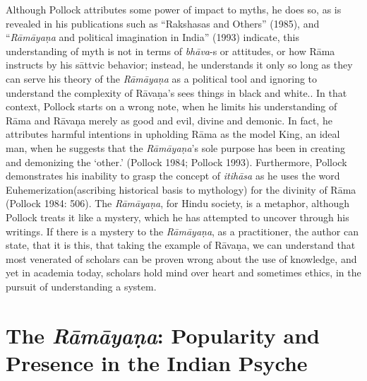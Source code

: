 {Although Pollock attributes some power of impact to myths, he does so, as is revealed in his publications such as “Rakshasas and Others” (1985), and “\textit{Rāmāyaṇa} and political imagination in India” (1993) indicate, this understanding of myth is not in terms of \textit{bhāva}-s or attitudes, or how Rāma instructs by his sāttvic behavior; instead, he understands it only so long as they can serve his theory of the \textit{Rāmāyaṇa} as a political tool and ignoring to understand the complexity of Rāvaṇa’s sees things in black and white.}. In that context, Pollock starts on a wrong note, when he limits his understanding of Rāma and Rāvaṇa merely as good and evil, divine and demonic. In fact, he attributes harmful intentions in upholding Rāma as the model King, an ideal man, when he suggests that the \textit{Rāmāyaṇa}’s sole purpose has been in creating and demonizing the ‘other.’ (Pollock 1984; Pollock 1993). Furthermore, Pollock demonstrates his inability to grasp the concept of \textit{itihāsa} as he uses the word Euhemerization(ascribing historical basis to mythology) for the divinity of Rāma (Pollock 1984: 506). The \textit{Rāmāyaṇa}, for Hindu society, is a metaphor, although Pollock treats it like a mystery, which he has attempted to uncover through his writings. If there is a mystery to the \textit{Rāmāyaṇa}, as a practitioner, the author can state, that it is this, that taking the example of Rāvaṇa, we can understand that most venerated of scholars can be proven wrong about the use of knowledge, and yet in academia today, scholars hold mind over heart and sometimes ethics, in the pursuit of understanding a system.


\section*{The \textit{Rāmāyaṇa}: Popularity and Presence in the Indian Psyche}

